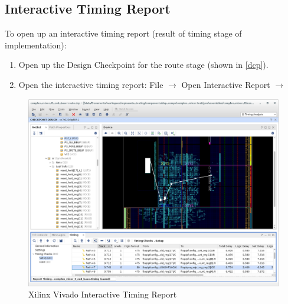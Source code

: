 \begin{flushleft}
\subsection{Interactive Timing Report}
To open up an interactive timing report (result of timing stage of implementation):
\begin{enumerate}
\item Open up the Design Checkpoint for the route stage (shown in \ref{dcp}).
\item Open the interactive timing report:
\subitem File $\rightarrow$ Open Interactive Report $\rightarrow$ 
\end{enumerate}
\begin{figure}[H]
	\centerline{\includegraphics[scale=0.4]{figures/xilinx_vivado_interactive_timing_report}}
	\caption{Xilinx Vivado Interactive Timing Report}
\end{figure}


\end{flushleft}
